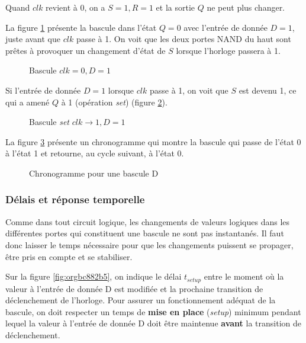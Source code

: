 \documentclass[11pt]{article}
\begin{document}
Quand \(clk\) revient à 0, on a \(S=1, R=1\) et la sortie \(Q\) ne
peut plus changer.

La figure \ref{fig:orgbf1f174} présente la bascule dans l'état \(Q=0\)
avec l'entrée de donnée \(D = 1\), juste avant que \(clk\) passe
à 1. On voit que les deux portes NAND du haut sont prêtes à provoquer
un changement d'état de \(S\) lorsque l'horloge passera à 1.

\begin{figure}[htbp]
\centering

\caption{\label{fig:orgbf1f174}Bascule   \(clk =0, D = 1\)}
\end{figure}

Si l'entrée de donnée \(D = 1\) lorsque \(clk\) passe à 1, on voit
que \(S\) est devenu 1, ce qui a amené \(Q\) à 1 (opération \emph{set})
(figure \ref{fig:orgc281d90}).

\begin{figure}[htbp]
\centering

\caption{\label{fig:orgc281d90}Bascule  \emph{set} \(clk \rightarrow 1, D=1\)}
\end{figure}

La figure \ref{fig:org72cc9b9} présente un chronogramme qui montre la bascule
qui passe de l'état 0 à l'état 1 et retourne, au cycle suivant, à
l'état 0.

\begin{figure}[htbp]
\centering

\caption{\label{fig:org72cc9b9}Chronogramme pour une bascule D}
\end{figure}

\subsubsection{Délais et réponse temporelle}
\label{sec:org288367f}

Comme dans tout circuit logique, les changements de valeurs logiques
dans les différentes portes qui constituent une bascule ne sont pas
instantanés. Il faut donc laisser le temps nécessaire pour que les
changements puissent se propager, être pris en compte et se stabiliser.

Sur la figure \ref{fig:orgbc882b5}, on indique le délai \(t_{setup}\) entre le
moment où la valeur à l'entrée de donnée D est modifiée et la
prochaine transition de déclenchement de l'horloge. Pour assurer un
fonctionnement adéquat de la bascule, on doit respecter un temps de
\textbf{mise en place} (\emph{setup}) minimum pendant lequel la valeur à l'entrée
de donnée D doit être maintenue \textbf{avant} la transition de
déclenchement.
\end{document}
